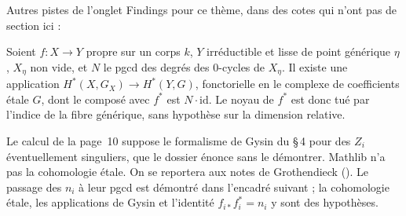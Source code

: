 \bigskip
\noindent Autres pistes de l'onglet Findings pour ce thème, dans des cotes qui n'ont pas de section ici :\par

\begin{encadre}
\begin{theoreme*}\nonverifie
Soient $f : X \to Y$ propre sur un corps $k$, $Y$ irréductible et lisse de point générique $\eta$, $X_\eta$ non vide, et $N$ le pgcd des degrés des $0$-cycles de $X_\eta$. Il existe une application $H^*(X, G_X) \to H^*(Y, G)$, fonctorielle en le complexe de coefficients étale $G$, dont le composé avec $f^*$ est $N \cdot \mathrm{id}$. Le noyau de $f^*$ est donc tué par l'indice de la fibre générique, sans hypothèse sur la dimension relative.
\end{theoreme*}
\end{encadre}
{\small Le calcul de la page~10 suppose le formalisme de Gysin du \S\,4 pour des $Z_i$ éventuellement singuliers, que le dossier énonce sans le démontrer. Mathlib n'a pas la cohomologie étale. On se reportera aux notes de Grothendieck (). Le passage des $n_i$ à leur pgcd est démontré dans l'encadré suivant ; la cohomologie étale, les applications de Gysin et l'identité $f_{i*}f_i^* = n_i$ y sont des hypothèses.\par}

